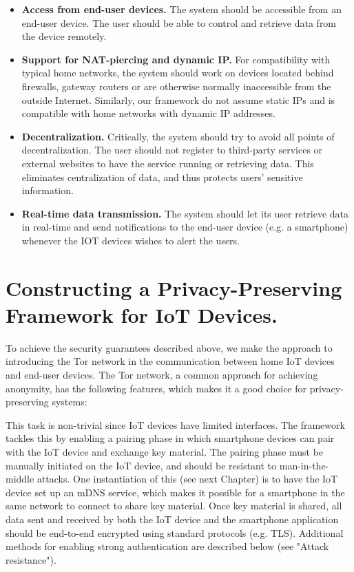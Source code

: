 \begin{itemize}
	\item \textbf{Access from end-user devices.} The system should be accessible from an end-user device. The user should be able to control and retrieve data from the device remotely. 
	\item \textbf{Support for NAT-piercing and dynamic IP.}  For compatibility with typical home networks, the system should work on devices located behind firewalls, gateway routers or are otherwise normally inaccessible from the outside Internet. Similarly, our framework do not assume static IPs and is compatible with home networks with dynamic IP addresses.
	\item \textbf{Decentralization.} Critically, the system should try to avoid all points of decentralization. The user should not register to third-party services or external websites to have the service running or retrieving data. This eliminates centralization of data, and thus protects users' sensitive information.
	\item \textbf{Real-time data transmission.} The system should let its user retrieve data in real-time and send notifications to the end-user device (e.g. a smartphone) whenever the IOT devices wishes to alert the users.
\end{itemize}



\section{Constructing a Privacy-Preserving Framework for IoT Devices.}
To achieve the security guarantees described above, we make the approach to introducing the Tor network in the communication between home IoT devices and end-user devices. The Tor network, a common approach for achieving anonymity\cite{dingledine2004tor}, has the following features, which makes it a good choice for privacy-preserving systems:


 This task is non-trivial since IoT devices have limited interfaces. The framework tackles this by enabling a pairing phase in which smartphone devices can pair with the IoT device and exchange key material. The pairing phase must be manually initiated on the IoT device, and should be resistant to man-in-the-middle attacks. One instantiation of this (see next Chapter) is to have the IoT device set up an mDNS service, which makes it possible for a smartphone in the same network to connect to share key material. Once key material is shared, all data sent and received by both the IoT device and the smartphone application should be end-to-end encrypted using standard protocols (e.g. TLS). Additional methods for enabling strong authentication are described below (see "Attack resistance").


